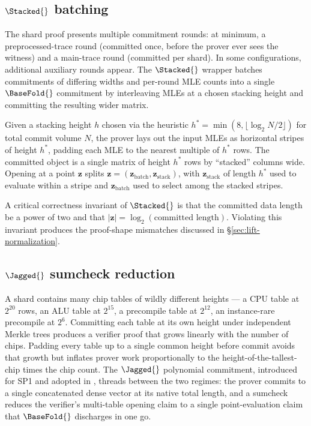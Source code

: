 \subsection{$\Stacked{}$ batching}
\label{sec:stacked}

The shard proof presents multiple commitment rounds: at minimum, a preprocessed-trace round (committed once, before the prover ever sees the witness) and a main-trace round (committed per shard). In some configurations, additional auxiliary rounds appear. The $\Stacked{}$ wrapper batches commitments of differing widths and per-round MLE counts into a single $\BaseFold{}$ commitment by interleaving MLEs at a chosen stacking height and committing the resulting wider matrix.

Given a stacking height $h$ chosen via the heuristic $h^* = \min(8, \lfloor \log_2 N/2 \rfloor)$ for total commit volume $N$, the prover lays out the input MLEs as horizontal stripes of height $h^*$, padding each MLE to the nearest multiple of $h^*$ rows. The committed object is a single matrix of height $h^*$ rows by ``stacked'' columns wide. Opening at a point $\bm{z}$ splits $\bm{z} = (\bm{z}_{\text{batch}}, \bm{z}_{\text{stack}})$, with $\bm{z}_{\text{stack}}$ of length $h^*$ used to evaluate within a stripe and $\bm{z}_{\text{batch}}$ used to select among the stacked stripes.

A critical correctness invariant of $\Stacked{}$ is that the committed data length be a power of two and that $|\bm{z}| = \log_2(\text{committed length})$. Violating this invariant produces the proof-shape mismatches discussed in \S\ref{sec:lift-normalization}.

\subsection{$\Jagged{}$ sumcheck reduction}
\label{sec:jagged}

A \zkVM{} shard contains many chip tables of wildly different heights — a CPU table at $2^{20}$ rows, an ALU table at $2^{15}$, a precompile table at $2^{12}$, an instance-rare precompile at $2^{6}$. Committing each table at its own height under independent Merkle trees produces a verifier proof that grows linearly with the number of chips. Padding every table up to a single common height before commit avoids that growth but inflates prover work proportionally to the height-of-the-tallest-chip times the chip count. The $\Jagged{}$ polynomial commitment, introduced for SP1 and adopted in \Zirenver{}, threads between the two regimes: the prover commits to a single concatenated dense vector at its native total length, and a sumcheck reduces the verifier's multi-table opening claim to a single point-evaluation claim that $\BaseFold{}$ discharges in one go.

